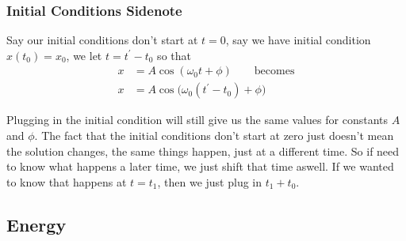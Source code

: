 \documentclass{article}
\begin{document}
\subsubsection{Initial Conditions Sidenote}
Say our initial conditions don't start at $t = 0$, say we have initial condition $x(t_0) = x_0$, we let $t = t^\prime - t_0$ so that
\begin{align*}
    x &= A\cos(\omega_0t + \phi)  \qquad\text{becomes} \\ 
    x &= A\cos\!\big(\omega_0(t^\prime - t_0) + \phi\big) 
\end{align*}

Plugging in the initial condition will still give us the same values for constants $A$ and $\phi$. The fact that the initial conditions don't start at zero just doesn't mean the solution changes, the same things happen, just at a different time. So if need to know what happens a later time, we just shift that time aswell. If we wanted to know that happens at $t = t_1$, then we just plug in $t_1 + t_0$. 
\subsection{Energy}
\end{document}
